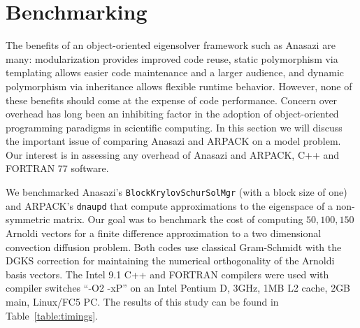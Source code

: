 \documentclass[acmtoms]{acmtrans2m}
\newcommand{\aspace}[1]{\texttt{#1}}
\begin{document}
\section{Benchmarking}
\label{sec:benchmarking}

The benefits of an object-oriented eigensolver framework such as
Anasazi are many: modularization provides improved code reuse,
static polymorphism via templating allows easier code maintenance and
a larger audience, and dynamic polymorphism via inheritance allows
flexible runtime behavior. However, none of these benefits should come
at the expense of code performance. Concern over overhead has long
been an inhibiting factor in the adoption of object-oriented
programming paradigms in scientific computing. In this section we
will discuss the important issue of comparing Anasazi and ARPACK
on a model problem. Our interest is in assessing any overhead of
Anasazi and ARPACK, C++ and FORTRAN 77 software.

We benchmarked Anasazi's \aspace{BlockKrylovSchurSolMgr} (with a block size
of one) and ARPACK's \aspace{dnaupd} that compute approximations to the
eigenspace of a non-symmetric matrix. Our goal was to benchmark the
cost of computing $50, 100, 150$ Arnoldi vectors for a finite
difference approximation to a two dimensional convection diffusion
problem. Both codes use classical Gram-Schmidt with the DGKS \cite{dgks:76} 
correction for maintaining the numerical orthogonality of the Arnoldi basis
vectors.  The Intel 9.1 C++ and FORTRAN compilers were used with
compiler switches ``-O2 -xP'' on an Intel Pentium D, 3GHz, 1MB L2
cache, 2GB main, Linux/FC5 PC.  The results of this study can be found
in Table~\ref{table:timings}.
\end{document}

